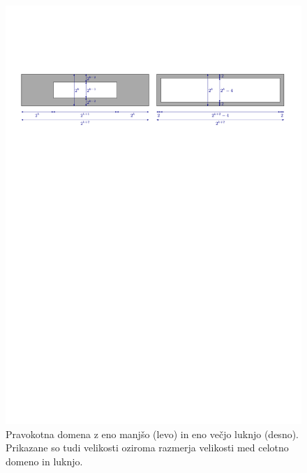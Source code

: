 \documentclass[a4paper, 12pt]{book}
\begin{document}
\begin{figure}[htp]
\centerline{\includegraphics[scale=0.75, page=1]{pics/data_generation.pdf}}
\caption{Pravokotna domena z eno manjšo (levo) in eno večjo luknjo (desno). Prikazane so tudi velikosti oziroma razmerja velikosti med celotno domeno in luknjo.}
\label{generation1}
\end{figure}
\end{document}
